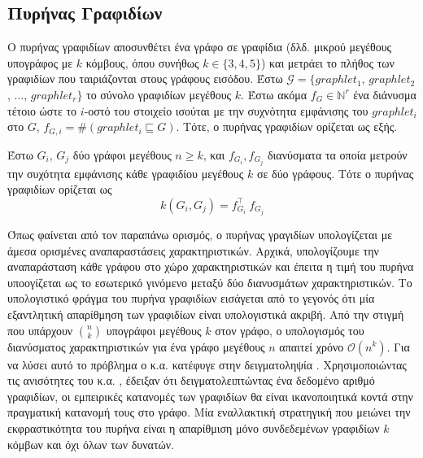 \subsection{Πυρήνας Γραφιδίων}
Ο πυρήνας γραφιδίων αποσυνθέτει ένα γράφο σε γραφίδια (δλδ. μικρού μεγέθους υπογράφος με $k$ κόμβους, όπου συνήθως $k \in \{ 3,4,5\}$) \cite{prvzulj2007biological} και μετράει το πλήθος των γραφιδίων που ταιριάζονται στους γράφους εισόδου.
Έστω $\mathcal{G} = \{ graphlet_1$, $graphlet_2$, $\ldots$, $graphlet_r\}$ το σύνολο γραφιδίων μεγέθους $k$.
Έστω ακόμα $f_G \in \mathbb{N}^r$ ένα διάνυσμα τέτοιο ώστε το $i$-οστό του στοιχείο ισούται με την συχνότητα εμφάνισης του
$graphlet_i$ στο $G$, $f_{G,i} = \#(graphlet_i \sqsubseteq G)$.
Τότε, ο πυρήνας γραφιδίων ορίζεται ως εξής.
\begin{definition}
	Έστω $G_i$, $G_j$ δύο γράφοι μεγέθους $n \geq k$, και $f_{G_i}, f_{G_j}$ διανύσματα τα οποία μετρούν την συχότητα εμφάνισης κάθε γραφιδίου μεγέθους $k$ σε δύο γράφους. 
	Τότε ο πυρήνας γραφιδίων ορίζεται ως
	\begin{equation}
  		k(G_i,G_j) = f_{G_i}^\top \ f_{G_j}
  	\end{equation}
\end{definition}
Όπως φαίνεται από τον παραπάνω ορισμός, ο πυρήνας γραγιδίων υπολογίζεται με άμεσα ορισμένες αναπαραστάσεις χαρακτηριστικών.
Αρχικά, υπολογίζουμε την αναπαράσταση κάθε γράφου στο χώρο χαρακτηριστικών και έπειτα η τιμή του πυρήνα υποογίζεται ως το εσωτερικό γινόμενο μεταξύ δύο διανυσμάτων χαρακτηριστικών.
Το υπολογιστικό φράγμα του πυρήνα γραφιδίων εισάγεται από το γεγονός ότι μία εξαντλητική απαρίθμηση των γραφιδίων είναι υπολογιστικά ακριβή.
Από την στιγμή που υπάρχουν $\binom{n}{k}$ υπογράφοι μεγέθους $k$ στον γράφο, ο υπολογισμός του διανύσματος χαρακτηριστικών για ένα γράφο μεγέθους $n$ απαιτεί χρόνο $\mathcal{O}(n^k)$.
Για να λύσει αυτό το πρόβλημα ο  κ.α. κατέφυγε στην δειγματοληψία \cite{shervashidze2009efficient}. 
Χρησιμοποιώντας τις ανισότητες του  κ.α. \cite{weissman2003inequalities}, έδειξαν ότι δειγματολειπτώντας ένα δεδομένο αριθμό γραφιδίων, οι εμπειρικές κατανομές των γραφιδίων θα είναι ικανοποιητικά κοντά στην πραγματική κατανομή τους στο γράφο.
Μία εναλλακτική στρατηγική που μειώνει την εκφραστικότητα του πυρήνα είναι η απαρίθμιση μόνο συνδεδεμένων γραφιδίων $k$ κόμβων και όχι όλων των δυνατών.


